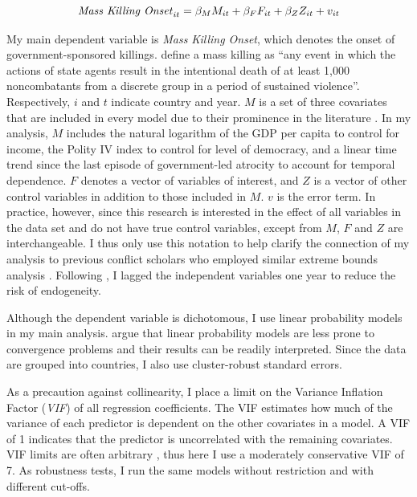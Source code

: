 \documentclass[a4paper,12pt]{article}
\begin{document}
\begin{equation}
\text{\textit{Mass Killing Onset}}_{it} = \beta_{M}M_{it} + \beta_{F}F_{it} + \beta_{Z}Z_{it} + v_{it}
\end{equation}
	
My main dependent variable is \textit{Mass Killing Onset}, which denotes the onset of government-sponsored killings. \citet[2]{ulfelder2008assessing} define a mass killing as ``any event in which the actions of state agents result in the intentional death of at least 1,000 noncombatants from a discrete group in a period of sustained violence''. Respectively, $i$ and $t$ indicate country and year. $M$ is a set of three covariates that are included in every model due to their prominence in the literature \citep{levine1992vale}. In my analysis, $M$ includes the natural logarithm of the GDP per capita to control for income, the Polity IV index to control for level of democracy, and a linear time trend since the last episode of government-led atrocity to account for temporal dependence. $F$ denotes a vector of variables of interest, and $Z$ is a vector of other control variables in addition to those included in $M$. $v$ is the error term. In practice, however, since this research is interested in the effect of all variables in the data set and do not have true control variables, except from $M$, $F$ and $Z$ are interchangeable. I thus only use this notation to help clarify the connection of my analysis to previous conflict scholars who employed similar extreme bounds analysis \citep[e.g.,][]{hegre2006sensitivity,gassebner2016expect}. Following \citet[514]{hegre2006sensitivity}, I lagged the independent variables one year to reduce the risk of endogeneity. 

Although the dependent variable is dichotomous, I use linear probability models in my main analysis. \citet[298]{gassebner2016expect} argue that linear probability models are less prone to convergence problems and their results can be readily interpreted. Since the data are grouped into countries, I also use cluster-robust standard errors.
	 
As a precaution against collinearity, I place a limit on the Variance Inflation Factor (\textit{VIF}) of all regression coefficients. The VIF estimates how much of the variance of each predictor is dependent on the other covariates in a model. A VIF of 1 indicates that the predictor is uncorrelated with the remaining covariates. VIF limits are often arbitrary \citep{bell2015examining,o2007caution}, thus here I use a moderately conservative VIF of 7. As robustness tests, I run the same models without restriction and with different cut-offs.
	
\end{document}
